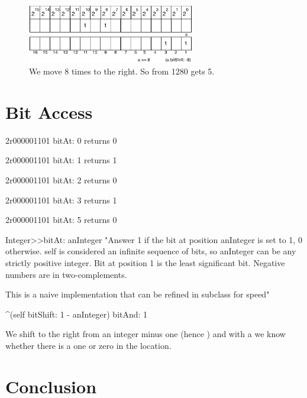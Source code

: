 \documentclass[a4paper,10pt,twoside]{book}
\begin{document}
\begin{figure}[h]
\begin{center}
\includegraphics[width=0.65\textwidth]{16bits-1280shifted8}
\caption{We move 8 times to the right. So from 1280 gets 5.}
\end{center}
\end{figure}







\section{Bit Access}

\begin{code}{}
2r000001101 bitAt: 0
	returns 0 
	
2r000001101 bitAt: 1
	returns 1 
	
2r000001101 bitAt: 2
	returns 0 
			
2r000001101 bitAt: 3
	returns 1
	 
2r000001101 bitAt: 5
	returns 0 	 
\end{code}


\begin{code}{}
Integer>>bitAt: anInteger
	"Answer 1 if the bit at position anInteger is set to 1, 0 otherwise.
	self is considered an infinite sequence of bits, so anInteger can be any strictly positive integer.
	Bit at position 1 is the least significant bit.
	Negative numbers are in two-complements.
	
	This is a naive implementation that can be refined in subclass for speed"
	
	^(self bitShift: 1 - anInteger) bitAnd: 1
\end{code}

We shift to the right from an integer minus one (hence )
and with a  we know whether there is a one or zero in the location.

%
\section{Conclusion}

\ifx\wholebook\relax\else
   
   
\end{document}
